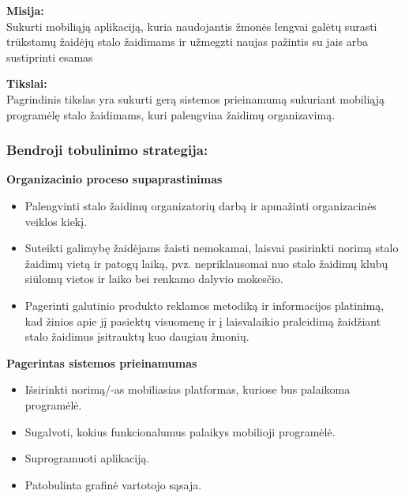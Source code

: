 \documentclass{VUMIFPSkursinis}
\begin{document}
		\textbf{Misija:}\\
		Sukurti mobiliąją aplikaciją, kuria naudojantis žmonės lengvai galėtų 
		surasti trūkstamų žaidėjų stalo žaidimams ir užmegzti naujas pažintis su 
		jais arba sustiprinti esamas

		\textbf{Tikslai:}\\
		Pagrindinis tikslas yra sukurti gerą sistemos prieinamumą sukuriant 
		mobiliąją programėlę stalo žaidimams, kuri palengvina žaidimų organizavimą.

		\subsubsection{Bendroji tobulinimo strategija:}
			\textbf{Organizacinio proceso supaprastinimas}
			\renewcommand{\labelitemi}{$\bullet$}
				\begin{itemize}
					\item Palengvinti stalo žaidimų organizatorių darbą ir apmažinti organizacinės veiklos kiekį.
					\item Suteikti galimybę žaidėjams žaisti nemokamai, laisvai pasirinkti norimą stalo žaidimų vietą ir patogų laiką, pvz. nepriklausomai nuo stalo žaidimų klubų siūlomų vietos ir laiko bei renkamo dalyvio mokesčio.
					\item Pagerinti galutinio produkto reklamos metodiką ir informacijos platinimą, kad žinios apie jį pasiektų visuomenę ir į laisvalaikio praleidimą žaidžiant stalo žaidimus įsitrauktų kuo daugiau žmonių.
				\end{itemize}	

			\textbf{Pagerintas sistemos prieinamumas}
			\renewcommand{\labelitemi}{$\bullet$}
				\begin{itemize}
					\item Išsirinkti norimą/-as mobiliasias platformas, kuriose bus palaikoma programėlė.
					\item Sugalvoti, kokius funkcionalumus palaikys mobilioji programėlė.
					\item Suprogramuoti aplikaciją.
					\item Patobulinta grafinė vartotojo sąsaja.
				\end{itemize}	
\end{document}
